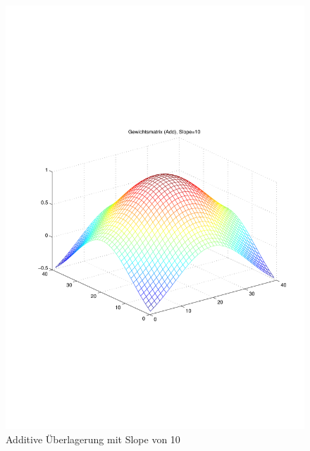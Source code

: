 \begin{figure}[hbt]
	\begin{minipage}{0.5 \textwidth}
		\includegraphics[width=\textwidth]{./Bilder/Auswertung/Gewichtsmatrix/Gewichtsmatrix_Add_Slope_10}
		\caption{Additive Überlagerung mit Slope von 10}
		\label{Add10}
	\end{minipage}
	\hfill
	\begin{minipage}{0.5 \textwidth}

\end{minipage}
\end{figure}
